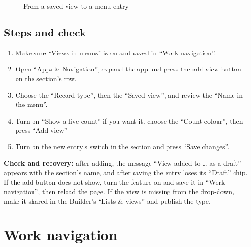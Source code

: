 \begin{figure}[H]
\centering
{}
\rclegend
\caption{From a saved view to a menu entry}
\label{fig:builder-navigation-views-flow}
\end{figure}

\subsection{Steps and check}
\begin{enumerate}
\item Make sure “Views in menus” is on and saved in “Work navigation”.
\item Open “Apps \& Navigation”, expand the app and press the add-view button on the section's row.
\item Choose the “Record type”, then the “Saved view”, and review the “Name in the menu”.
\item Turn on “Show a live count” if you want it, choose the “Count colour”, then press “Add view”.
\item Turn on the new entry's switch in the section and press “Save changes”.
\end{enumerate}

\textbf{Check and recovery:} after adding, the message “View added to … as a draft” appears with the section's name, and after saving the entry loses its “Draft” chip. If the add button does not show, turn the feature on and save it in “Work navigation”, then reload the page. If the view is missing from the drop-down, make it shared in the Builder's “Lists \& views” and publish the type.

\clearpage
\section{Work navigation}
\label{sec:builder-feature-work-navigation}

